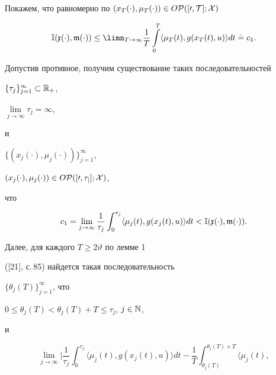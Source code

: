 \begin{pf}


Покажем, что равномерно по $(x_T(\cdot),\mu_T(\cdot))\in O\cal P([0,T];X)$


\begin{equation}


\Bbb I(\frak x(\cdot),\frak m(\cdot))\le


\limn_{T\to\infty}\frac{1}{T}


\int\limits_0^T\langle\mu_T(t),g(x_{T}(t),u)\rangle dt\doteq c_1.


\end{equation}





Допустив противное, получим существование таких последовательностей


$\{\tau_j\}_{j=1}^\infty\subset\Bbb R_+$,


$\lim\limits_{j\to\infty}\tau_j=\infty$,


и


$\{(x_j(\cdot),\mu_j(\cdot))\}_{j=1}^\infty$,


$(x_j(\cdot),\mu_j(\cdot))\in O\cal P([0,\tau_j];X)$,


что


\begin{equation}


c_1=\lim_{j\to\infty}\frac{1}{\tau_j}


\int_0^{\tau_j}\langle\mu_j(t),


g(x_j(t),u)\rangle dt<\Bbb I(\frak x(\cdot),\frak m(\cdot)).


\end{equation}





Далее, для каждого $T\ge2\vartheta$ по лемме 1


([21], с.\,85) найдется такая последовательность


$\{\theta_j(T)\}_{j=1}^\infty$, что


$0\le\theta_j(T)<\theta_j(T)+T\le\tau_j$, $j\in\Bbb N$,


и


\begin{equation}


\lim_{j\to\infty}\bigg|\frac{1}{\tau_j}


\int_0^{\tau_j}\langle\mu_j(t),


g(x_j(t),u)\rangle dt-\frac{1}{T}


\int_{\theta_j(T)}^{\theta_j(T)+T}\langle\mu_j(t),



\end{equation}
\end{pf}
